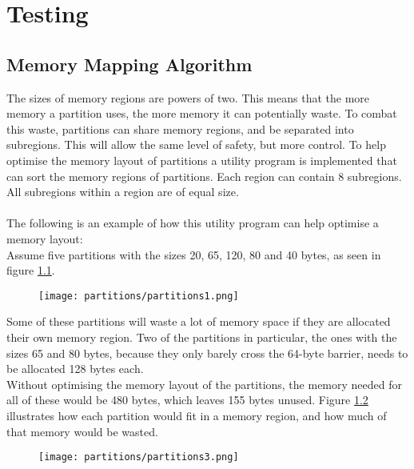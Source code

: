 \chapter{Testing}

\section{Memory Mapping Algorithm}
The sizes of memory regions are powers of two. This means that the more
memory a partition uses, the more memory it can potentially waste. To combat
this waste, partitions can share memory regions, and be separated
into subregions. This will allow the same level of safety, but more control.
To help optimise the memory layout of partitions a utility program is implemented
that can sort the memory regions of partitions. Each region can contain 8
subregions. All subregions within a region are of equal size.
\\\\
The following is an example of how this utility program can help optimise a
memory layout:
\\


Assume five partitions with the sizes 20, 65, 120, 80 and 40 bytes, as seen in figure \ref{fig:ce2}.\\

\begin{figure}[H]
\centering
\texttt{[image: partitions/partitions1.png]}
\label{fig:ce2}
\end{figure}

Some of these partitions will waste a lot of memory space if they are allocated their
own memory region. Two of the partitions in particular, the ones with the sizes
65 and 80 bytes, because they only barely cross the 64-byte barrier, needs to be
allocated 128 bytes each.\\
Without optimising the memory layout of the partitions, the memory needed for
all of these would be 480 bytes, which leaves 155 bytes unused. Figure
\ref{fig:ce3} illustrates how each partition would fit in a memory region, and how
much of that memory would be wasted.

\begin{figure}[H]
\centering
\texttt{[image: partitions/partitions3.png]}
\label{fig:ce3}
\end{figure}

